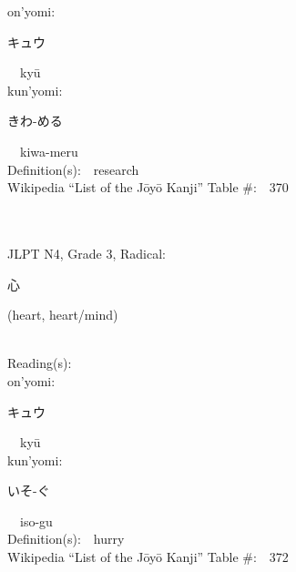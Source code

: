 \begin{multicols}{2}
{\hspace*{1em}}on'yomi:\ \ \\
{\hspace*{2em}}{\begin{CJK}{UTF8}{min} キュウ \end{CJK}}\ \ ky\=u\ \ \\
{\hspace*{1em}}kun'yomi:\ \ \\
{\hspace*{2em}}{\begin{CJK}{UTF8}{min} きわ-める \end{CJK}}\ \ kiwa-meru\ \ \\
Definition(s):\ \ research \\
Wikipedia ``List of the J\=oy\=o Kanji'' Table \#:\ \ 370 \\
\ \ \\
{\fontsize{34pt}{40pt}  }\ \ \\  %
{JLPT N4, Grade 3, Radical:\ \ {\begin{CJK}{UTF8}{min} 心 \end{CJK}} (heart, heart/mind) } \\
Reading(s):\ \ \\
{\hspace*{1em}}on'yomi:\ \ \\
{\hspace*{2em}}{\begin{CJK}{UTF8}{min} キュウ \end{CJK}}\ \ ky\=u\ \ \\
{\hspace*{1em}}kun'yomi:\ \ \\
{\hspace*{2em}}{\begin{CJK}{UTF8}{min} いそ-ぐ \end{CJK}}\ \ iso-gu\ \ \\
Definition(s):\ \ hurry \\
Wikipedia ``List of the J\=oy\=o Kanji'' Table \#:\ \ 372 \\
\ \ \\
{\fontsize{34pt}{40pt}  }\ \ \\  %

\end{multicols}
